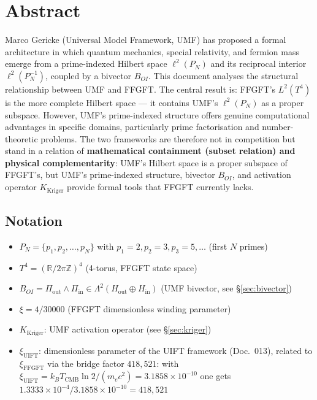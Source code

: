 
\section*{Abstract}

Marco Gericke (Universal Model Framework, UMF) has proposed a formal architecture
in which quantum mechanics, special relativity, and fermion mass emerge from a
prime-indexed Hilbert space $\ell^2(P_N)$ and its reciprocal interior
$\ell^2(P_N^{-1})$, coupled by a bivector $B_{OI}$. This document analyses the
structural relationship between UMF and FFGFT. The central result is:
FFGFT's $L^2(T^4)$ is the more complete Hilbert space — it contains UMF's
$\ell^2(P_N)$ as a proper subspace. However, UMF's prime-indexed structure offers
genuine computational advantages in specific domains, particularly prime
factorisation and number-theoretic problems. The two frameworks are therefore not in competition but stand in a relation of \textbf{mathematical containment (subset relation) and physical complementarity}: UMF's Hilbert space is a proper subspace of FFGFT's, but UMF's prime-indexed structure, bivector $B_{OI}$, and activation operator $K_\text{Kriger}$ provide formal tools that FFGFT currently lacks.

\subsection*{Notation}

\begin{itemize}
  \item $P_N = \{p_1, p_2, \dots, p_N\}$ with $p_1=2, p_2=3, p_3=5, \dots$ (first $N$ primes)
  \item $T^4 = (\mathbb{R}/2\pi\mathbb{Z})^4$ (4-torus, FFGFT state space)
  \item $B_{OI} = \Pi_\text{out} \wedge \Pi_\text{in} \in \Lambda^2(H_\text{out} \oplus H_\text{in})$
    (UMF bivector, see \S\ref{sec:bivector})
  \item $\xi = 4/30000$ (FFGFT dimensionless winding parameter)
  \item $K_\text{Kriger}$: UMF activation operator (see \S\ref{sec:kriger})
  \item $\xi_\text{UIFT}$: dimensionless parameter of the UIFT framework (Doc.~013), related to $\xi_\text{FFGFT}$ via the bridge factor $418{,}521$: with $\xi_\text{UIFT} = k_BT_\text{CMB}\ln2/(m_ec^2) = 3.1858\times10^{-10}$ one gets $1.3333\times10^{-4}/3.1858\times10^{-10} = 418{,}521$
\end{itemize}

